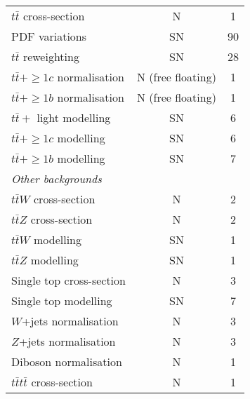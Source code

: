 \begin{table}[htbp]
\begin{tabular}{lcc}
  \hspace{2ex}$t\bar t$ cross-section           &   N   & 1  \\
  \hspace{2ex} PDF variations                   &  SN  & 90   \\
  \hspace{2ex}$t\bar t$ reweighting             &   SN  & 28  \\
  \hspace{2ex}$t\bar t +\ge 1c$ normalisation   &   N (free floating) & 1 \\
  \hspace{2ex}$t\bar t +\ge 1b$ normalisation   &   N (free floating) & 1 \\
  \hspace{2ex}$t\bar t +$ light modelling       &  SN  &  6  \\
  \hspace{2ex}$t\bar t +\ge 1c$  modelling      &  SN  &  6  \\
  \hspace{2ex}$t\bar t +\ge 1b$  modelling      &  SN  &  7  \\
  \midrule
  \multicolumn{3}{l}{\textit{Other backgrounds}} \\
  \hspace{2ex}$t\bar{t}W$ cross-section		    &   N  &  2  \\
  \hspace{2ex}$t\bar{t}Z$ cross-section		    &   N  &  2  \\
  \hspace{2ex}$t\bar{t}W$ modelling			    &  SN  &  1  \\
  \hspace{2ex}$t\bar{t}Z$ modelling			    &  SN  &  1  \\
  \hspace{2ex}Single top cross-section		    &   N  &  3  \\
  \hspace{2ex}Single top modelling			    &  SN  &  7  \\
  \hspace{2ex}$W$+jets normalisation		    &   N  &  3  \\
  \hspace{2ex}$Z$+jets normalisation		    &   N  &  3  \\
  \hspace{2ex}Diboson normalisation			    &   N  &  1  \\
  \hspace{2ex}$t\bar{t}t\bar{t}$ cross-section	&   N  &  1  \\

\end{tabular}
\end{table}
